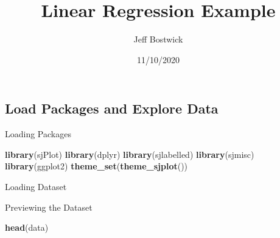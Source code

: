 \documentclass[
]{article}
\title{Linear Regression Example}
\author{Jeff Bostwick}
\date{11/10/2020}
\newenvironment{Shaded}{\begin{snugshade}}{\end{snugshade}}
\newcommand{\KeywordTok}[1]{\textcolor[rgb]{0.13,0.29,0.53}{\textbf{#1}}}
\newcommand{\NormalTok}[1]{#1}
\begin{document}
\maketitle

{
\setcounter{tocdepth}{2}
\tableofcontents
}
\hypertarget{load-packages-and-explore-data}{%
\subsection{Load Packages and Explore
Data}\label{load-packages-and-explore-data}}

Loading Packages

\begin{Shaded}
\begin{Highlighting}[]
\KeywordTok{library}\NormalTok{(sjPlot)}
\KeywordTok{library}\NormalTok{(dplyr)}
\KeywordTok{library}\NormalTok{(sjlabelled)}
\KeywordTok{library}\NormalTok{(sjmisc)}
\KeywordTok{library}\NormalTok{(ggplot2)}
\KeywordTok{theme_set}\NormalTok{(}\KeywordTok{theme_sjplot}\NormalTok{())}
\end{Highlighting}
\end{Shaded}

Loading Dataset

Previewing the Dataset

\begin{Shaded}
\begin{Highlighting}[]
\KeywordTok{head}\NormalTok{(data)}
\end{Highlighting}
\end{Shaded}
\end{document}
